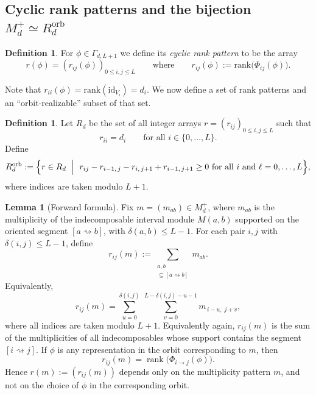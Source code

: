 \documentclass{article}
\theoremstyle{definition}
\newtheorem{lemma}[theorem]{Lemma}
\newtheorem{definition}[theorem]{Definition}
\begin{document}
\subsection{Cyclic rank patterns and the bijection $M_d^+\simeq R_d^{\mathrm{orb}}$}
\begin{definition}\label{def:cyclic-rank-pattern}
For $\phi\in\Gamma_{d,L+1}$ we define its \emph{cyclic rank pattern} to be the array
\[
r(\phi)=(r_{ij}(\phi))_{0\le i,j\le L}
\qquad\text{where}\qquad
r_{ij}(\phi):=\mathrm{rank}\bigl(\Phi_{ij}(\phi)\bigr).
\]
\end{definition}
\noindent
Note that $r_{ii}(\phi)=\mathrm{rank}(\mathrm{id}_{V_i})=d_i$.
We now define a set of rank patterns and an ``orbit-realizable''
subset of that set.
\begin{definition}\label{def:Rd}
Let $R_d$ be the set of all integer arrays $r=(r_{ij})_{0\le i,j\le L}$
such that
\[
r_{ii}=d_i\qquad\text{for all }i\in\{0,\dots,L\}.
\]
Define
\[
R_d^{\mathrm{orb}}
:=
\Bigl\{
r\in R_d \ \Bigm|\ 
r_{ij}
-
r_{i-1,\,j}
-
r_{i,\,j+1}
+
r_{i-1,\,j+1}\ge 0 \ \text{for all } i\text{ and } \ell=0,\dots,L
\Bigr\},
\]
where indices are taken modulo $L+1$.
\end{definition}
\begin{lemma}[Forward formula]\label{lem:forward-formula}
Fix \(m=(m_{ab})\in M_d^+\), where \(m_{ab}\) is the multiplicity of the indecomposable interval
module \(M(a,b)\) supported on the oriented segment \([a\rightsquigarrow b]\), with
\(\delta(a,b)\le L - 1\).
\noindent
For each pair \(i,j\) with \(\delta(i,j)\le L - 1\), define
\[
r_{ij}(m)
:=
\sum_{\substack{a,b\\ [i\rightsquigarrow j]\subseteq [a\rightsquigarrow b]}} m_{ab}.
\]
Equivalently,
\[
r_{ij}(m)
=
\sum_{u=0}^{\delta(i,j)}
\ \sum_{v=0}^{L-\delta(i,j)-u - 1}
m_{\,i-u,\; j+v},
\]
where all indices are taken modulo \(L+1\). Equivalently again, \(r_{ij}(m)\) is the sum of the
multiplicities of all indecomposables whose support contains the segment \([i\rightsquigarrow j]\).
\noindent
If \(\phi\) is any representation in the orbit corresponding to \(m\), then
\[
r_{ij}(m)=\operatorname{rank}\bigl(\Phi_{i\to j}(\phi)\bigr).
\]
Hence \(r(m):=(r_{ij}(m))\) depends only on the multiplicity pattern \(m\), and not on the choice of
\(\phi\) in the corresponding orbit.
\end{lemma}
\end{document}
